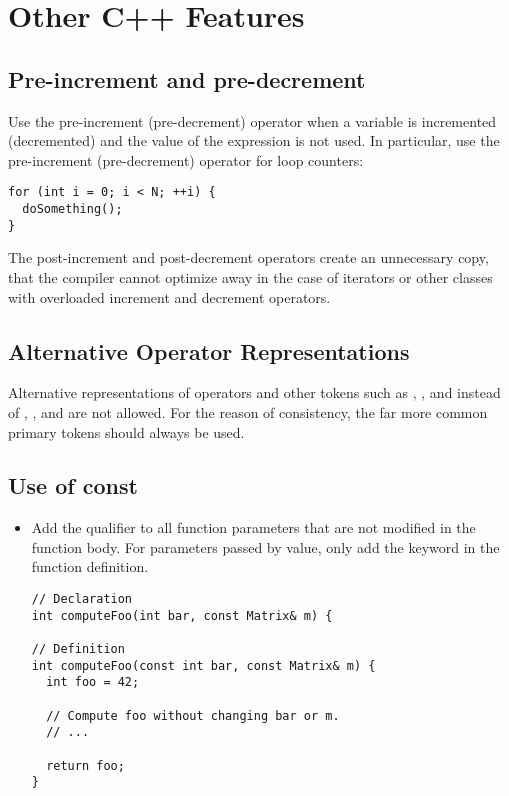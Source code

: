 \section{Other C++ Features}

\subsection{Pre-increment and pre-decrement}

Use the pre-increment (pre-decrement) operator when a variable is incremented (decremented) and the value of the expression is not used.
In particular, use the pre-increment (pre-decrement) operator for loop counters:

\begin{lstlisting}[showspaces=false]
for (int i = 0; i < N; ++i) {
  doSomething();
}
\end{lstlisting}

The post-increment and post-decrement operators create an unnecessary copy, that the compiler cannot optimize away in the case of iterators or other classes with overloaded increment and decrement operators.

\subsection{Alternative Operator Representations}

Alternative representations of operators and other tokens such as , , and  instead of \inlinecode{&&}, \inlinecode{||}, and \inlinecode{!} are not allowed.
For the reason of consistency, the far more common primary tokens should always be used.

\subsection{Use of const}

\begin{itemize}

\item Add the  qualifier to all function parameters that are not modified in the function body.
For parameters passed by value, only add the keyword in the function definition.

\begin{lstlisting}[showspaces=false]
// Declaration
int computeFoo(int bar, const Matrix& m) {

// Definition
int computeFoo(const int bar, const Matrix& m) {
  int foo = 42;

  // Compute foo without changing bar or m.
  // ...

  return foo;
}
\end{lstlisting}

\end{itemize}

